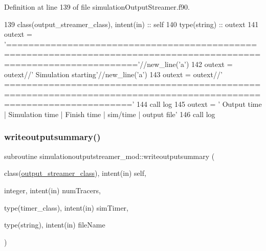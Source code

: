 Definition at line 139 of file simulation\+Output\+Streamer.\+f90.


\begin{DoxyCode}
139     \textcolor{keywordtype}{class}(output\_streamer\_class), \textcolor{keywordtype}{intent(in)} :: self
140     \textcolor{keywordtype}{type}(string) :: outext
141     outext =         \textcolor{stringliteral}{
      '==================================================================================================================='}//new\_line(\textcolor{stringliteral}{'a'})
142     outext = outext//\textcolor{stringliteral}{'                                             Simulation starting'}//new\_line(\textcolor{stringliteral}{'a'})
143     outext = outext//\textcolor{stringliteral}{'
       ==================================================================================================================='}
144     \textcolor{keyword}{call }log%
145     outext = \textcolor{stringliteral}{'    Output time    |   Simulation time   |      Finish time    |     %
       sim/time | output file'}
146     \textcolor{keyword}{call }log%
\end{DoxyCode}
\mbox{\label{namespacesimulationoutputstreamer__mod_a8b34c75e869c6409de7d6e5ceca5cca7}} 
\subsubsection{\texorpdfstring{writeoutputsummary()}{writeoutputsummary()}}
{\footnotesize\ttfamily subroutine simulationoutputstreamer\+\_\+mod\+::writeoutputsummary (\begin{DoxyParamCaption}\item[{class(\mbox{\hyperlink{structsimulationoutputstreamer__mod_1_1output__streamer__class}{output\+\_\+streamer\+\_\+class}}), intent(in)}]{self,  }\item[{integer, intent(in)}]{num\+Tracers,  }\item[{type(timer\+\_\+class), intent(in)}]{sim\+Timer,  }\item[{type(string), intent(in)}]{file\+Name }\end{DoxyParamCaption})\hspace{0.3cm}{\ttfamily [private]}}



